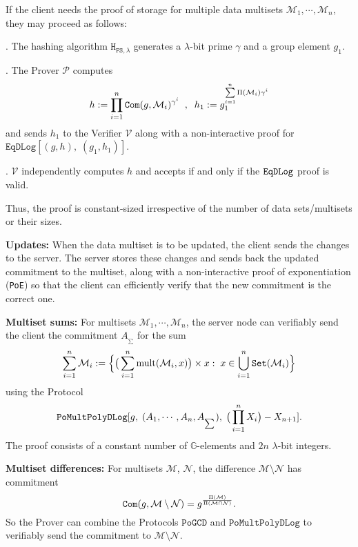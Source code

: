 \documentclass[11pt, lettersize, notitlepage, leqno, footskip=0.6cm]{article}
\newcommand{\pl}{\prod\limits}
\newcommand{\slim}{\sum\limits}
\newcommand{\ttt}{\texttt}
\newcommand{\sett}{\ttt{Set}}
\newcommand{\mul}{\mr{mult}}
\newcommand{\mc}{\mathcal}
\newcommand{\mb}{\mathbb}
\newcommand{\mr}{\mathrm}
\newcommand{\sm}{\setminus}
\newcommand{\lam}{\lambda}
\newcommand{\mP}{\mc{P}}
\newcommand{\V}{\mc{V}}
\newcommand{\mcM}{\mc{M}}
\newcommand{\vs}{\vspace{-0.15cm}}
\newcommand{\noin}{\noindent}
\numberwithin{equation}{section}
\begin{document}
If the client needs the proof of storage for multiple data multisets $\mc{M}_1,\cdots,\mc{M}_n$, they may proceed as follows: \vspace{0.1cm}

\noin 1. The hashing algorithm $\ttt{H}_{\ttt{FS},\lam}$ generates a $\lam$-bit prime $\gamma$ and a group element $g_1$.

\noin 2. The Prover $\mP$ computes \vs $$h:= \pl_{i=1}^n \ttt{Com}(g, \mcM_i)^{\gamma^i}\;\;,\;\;h_1:= g_1^{\slim_{i=1}^n \Pi(\mcM_i)\gamma^i}\vs $$ and sends $h_1$ to the Verifier $\V$ along with a non-interactive proof for $\ttt{EqDLog}[(g,h),\;(g_1,h_1)]$.

\noin 3. $\V$ independently computes $h$ and accepts if and only if the $\tt{EqDLog}$ proof is valid.\vspace{0.1cm}


\noin Thus, the proof is constant-sized irrespective of the number of data sets/multisets or their sizes.



\vspace{0.2cm}

\noin \textbf{Updates:} When the data multiset is to be updated, the client sends the changes to the server. The server stores these changes and sends back the updated commitment to the multiset, along with a non-interactive proof of exponentiation (\verb|PoE|) so that the client can efficiently verify that the new commitment is the correct one. \vspace{0.15cm}

\noin \textbf{Multiset sums:} For multisets $\mc{M}_1,\cdots,\mc{M}_n$, the server node can verifiably send the client the commitment $A_{_{\sum}}$ for the sum \vspace{-0.3cm}$$\sum\limits_{i=1}^n \mc{M}_i := \Big\{\big(\sum\limits_{i=1}^n \mul(\mc{M}_i, x)\big)\times x:\; x\in\bigcup\limits_{i=1}^n \sett(\mc{M}_i)\Big\} \vs $$ using the Protocol \vspace{-0.3cm} $$\ttt{PoMultPolyDLog}[g,\; (A_1,\cdots,A_n,A_{_{\sum}}),\;\big(\pl_{i=1}^{n}X_i\big)-X_{n+1}]. \vs $$ The proof consists of a constant number of $\mb{G}$-elements and $2n$ $\lam$-bit integers.

\bigskip

\noin \textbf{Multiset differences:} For multisets $\mc{M}$, $\mc{N}$, the difference $\mc{M}\sm \mc{N} $ has commitment \vs $$\protect{\verb|Com|}(g, \mc{M}\sm \mc{N}) = g^{\frac{\Pi(\mcM)}{\Pi(\mcM\cap \mc{N})}} .\vs $$ So the Prover can combine the Protocols $\ttt{PoGCD}$ and $\ttt{PoMultPolyDLog}$ to verifiably send the commitment to $\mc{M}\sm \mc{N} $. 
\end{document}
